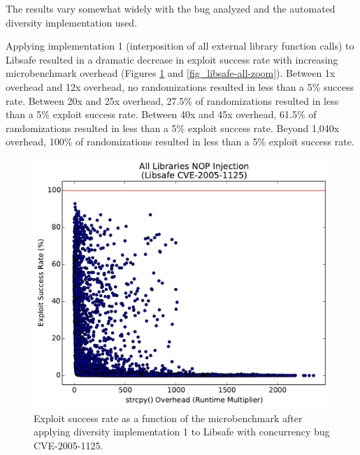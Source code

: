 The results vary somewhat widely with the bug analyzed and the automated diversity implementation used.

Applying implementation 1 (interposition of all external library function calls) to Libsafe resulted in a dramatic decrease in exploit success rate with increasing microbenchmark overhead (Figures \ref{fig_libsafe-all} and \ref{fig_libsafe-all-zoom}).
Between 1x overhead and 12x overhead, no randomizations resulted in less than a 5\% success rate.
Between 20x and 25x overhead, 27.5\% of randomizations resulted in less than a 5\% exploit success rate.
Between 40x and 45x overhead, 61.5\% of randomizations resulted in less than a 5\% exploit success rate.
Beyond 1,040x overhead, 100\% of randomizations resulted in less than a 5\% exploit success rate.
\begin{figure}
	\centering
	\includegraphics[width=\columnwidth]{figures/libsafe-all}
	\caption{Exploit success rate as a function of the microbenchmark after applying diversity implementation 1 to Libsafe with concurrency bug CVE-2005-1125.}
	\label{fig_libsafe-all}
\end{figure}
